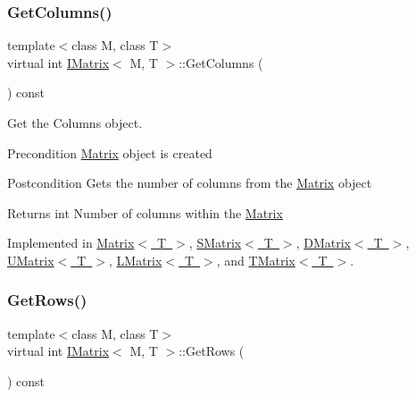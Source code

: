 \mbox{\label{class_i_matrix_a3b84da3898ef38bdf281c13f218fc278}} 
\subsubsection{\texorpdfstring{GetColumns()}{GetColumns()}}
{\footnotesize\ttfamily template$<$class M, class T$>$ \\
virtual int \mbox{\hyperlink{class_i_matrix}{I\+Matrix}}$<$ M, T $>$\+::Get\+Columns (\begin{DoxyParamCaption}{ }\end{DoxyParamCaption}) const\hspace{0.3cm}{\ttfamily [pure virtual]}}



Get the Columns object. 

\begin{DoxyPrecond}{Precondition}
\mbox{\hyperlink{class_matrix}{Matrix}} object is created 
\end{DoxyPrecond}
\begin{DoxyPostcond}{Postcondition}
Gets the number of columns from the \mbox{\hyperlink{class_matrix}{Matrix}} object 
\end{DoxyPostcond}
\begin{DoxyReturn}{Returns}
int Number of columns within the \mbox{\hyperlink{class_matrix}{Matrix}} 
\end{DoxyReturn}


Implemented in \mbox{\hyperlink{class_matrix_ada60917bb197292e0645992e108c2c2f}{Matrix$<$ T $>$}}, \mbox{\hyperlink{class_s_matrix_a5933f5269b187ef02e892de067c09481}{S\+Matrix$<$ T $>$}}, \mbox{\hyperlink{class_d_matrix_a1a2b5bfdc2b11980472e4754cca4f80e}{D\+Matrix$<$ T $>$}}, \mbox{\hyperlink{class_u_matrix_a4065961abb79fd43d7abaf10c47e73d8}{U\+Matrix$<$ T $>$}}, \mbox{\hyperlink{class_l_matrix_ae7adc0f92e3648751fe49852ad158ea2}{L\+Matrix$<$ T $>$}}, and \mbox{\hyperlink{class_t_matrix_ab4ca595133f10eadcebe6d78aa260d0c}{T\+Matrix$<$ T $>$}}.

\mbox{\label{class_i_matrix_a58632b018f4023768db7963e22f468da}} 
\subsubsection{\texorpdfstring{GetRows()}{GetRows()}}
{\footnotesize\ttfamily template$<$class M, class T$>$ \\
virtual int \mbox{\hyperlink{class_i_matrix}{I\+Matrix}}$<$ M, T $>$\+::Get\+Rows (\begin{DoxyParamCaption}{ }\end{DoxyParamCaption}) const\hspace{0.3cm}{\ttfamily [pure virtual]}}



